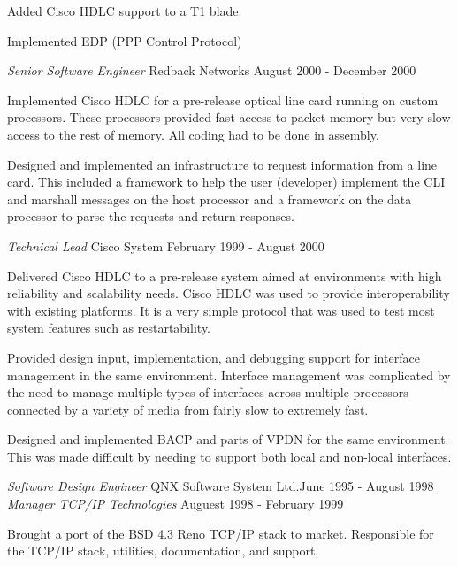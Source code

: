 \documentclass[margin]{res}
\begin{document}
\begin{resume}
                Added Cisco HDLC support to a T1 blade.

                Implemented EDP (PPP Control Protocol)

                {\sl\large Senior Software Engineer} Redback  Networks \hfill August 2000 - December 2000

                Implemented Cisco HDLC for a pre-release optical line card
                running on custom processors. These processors provided
                fast access to packet memory but very slow access to the
                rest of memory. All coding had to be done in assembly.

                Designed and implemented an infrastructure to request
                information from a line card. This included a framework to
                help the user (developer) implement the CLI and marshall
                messages on the host processor and a framework on the data
                processor to parse the requests and return responses.

                {\sl\large Technical Lead } Cisco System \hfill February 1999 - August 2000

                Delivered Cisco HDLC to a pre-release system aimed at environments with
                high reliability and scalability needs. Cisco HDLC was used to provide
                interoperability with existing platforms. It is a very simple protocol
                that was used to test most system features such as restartability.


                Provided design input, implementation, and debugging support for
                interface management in the same environment. Interface management was
                complicated by the need to manage multiple types of interfaces across
                multiple processors connected by a variety of media from fairly slow to
                extremely fast.

                Designed and implemented BACP and parts of VPDN for the same
                environment. This was made difficult by needing to support both local
                and non-local interfaces.

                {\sl\large Software Design Engineer } QNX Software System Ltd.\hfill June 1995 - August 1998 \\
                {\sl Manager TCP/IP Technologies } \hfill Auguest 1998 - February 1999

                Brought a port of the BSD 4.3 Reno TCP/IP stack to
                market. Responsible for the TCP/IP stack, utilities,
                documentation, and support.


\end{resume}
\end{document}
